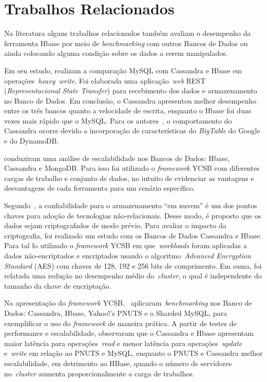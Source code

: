 \documentclass[12pt]{article}
\begin{document}
\section{Trabalhos Relacionados} 
\label{sec:relacionados}

Na literatura alguns trabalhos relacionados também avaliam o desempenho da ferramenta Hbase por meio de \textit{benchmarking} com outros Bancos de Dados ou ainda colocando alguma condição sobre os dados a serem manipulados.

Em seu estudo, \cite{jogi2016performance} realizam a comparação MySQL com Cassandra e Hbase em operações~\emph{heavy~\emph{write}}. Foi elaborada uma aplicação~\emph{web} REST (\emph{Representacional State Transfer}) para recebimento dos dados e armazenamento no Banco de Dados. Em conclusão, o Cassandra apresentou melhor desempenho entre os três bancos quanto a velocidade de escrita, enquanto o Hbase foi duas vezes mais rápido que o MySQL. Para os autores~\cite{jogi2016performance}, o comportamento do Cassandra ocorre devido a incorporação de características do \emph{BigTable} do Google e do DynamoDB.

\cite{swaminathan2016quantitative} conduziram uma análise de escalabilidade nos Bancos de Dados: Hbase, Cassandra e MongoDB. Para isso foi utilizado o \textit{framework} YCSB com diferentes cargas de trabalho e conjunto de dados, no intuito de evidenciar as vantagens e desvantagens de cada ferramenta para um cenário específico.

Segundo~\cite{waage2014benchmarking}, a confiabilidade para o armazenamento ``em nuvem'' é um dos pontos chaves para adoção de tecnologias não-relacionais. Desse modo, é proposto que os dados sejam criptografados de modo prévio. Para avaliar o impacto da criptografia, foi realizado um estudo com os Bancos de Dados Cassandra e Hbase. Para tal fo utilizado o \emph{framework} YCSB em que~\emph{workloads} foram aplicadas a dados não-encriptados e encriptados usando o algoritmo~\emph{Advanced Encryption Standard} (AES) com chaves de 128, 192 e 256 bits de comprimento. Em suma, foi relatada uma redução no desempenho médio do~\emph{cluster}, o qual é independente do tamanho da chave de encriptação.

Na apresentação do \textit{framework} YCSB,~\cite{cooper2010benchmarking} aplicaram~\emph{benchmarking} nos Banco de Dados: Cassandra, Hbase, Yahoo!’s PNUTS e o Sharded MySQL, para exemplificar o uso do \textit{framework} de maneira prática. A partir de testes de performance e escalabilidade, observaram que o Cassandra e Hbase apresentam maior latência para operações~\emph{read} e menor latência para operações~\emph{update} e~\emph{write} em relação ao PNUTS e MySQL, enquanto o PNUTS e Cassandra melhor escalabilidade, em detrimento ao HBase, quando o número de servidores no~\emph{cluster} aumenta proporcionalmente a carga de trabalhos.
\end{document}
